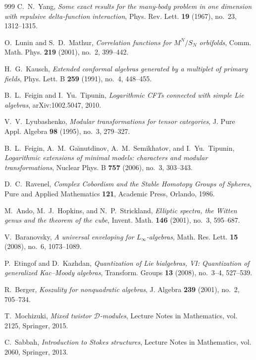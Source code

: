 \begin{thebibliography}{999}
C.~N.~Yang, \emph{Some exact results for the many-body problem in one dimension with repulsive delta-function interaction}, Phys. Rev. Lett. \textbf{19} (1967), no.~23, 1312--1315.

O.~Lunin and S.~D.~Mathur, \emph{Correlation functions for $M^N/S_N$ orbifolds}, Comm. Math. Phys. \textbf{219} (2001), no.~2, 399--442.

H.~G.~Kausch, \emph{Extended conformal algebras generated by a multiplet of primary fields}, Phys. Lett. B \textbf{259} (1991), no.~4, 448--455.

B.~L.~Feigin and I.~Yu.~Tipunin, \emph{Logarithmic CFTs connected with simple Lie algebras}, arXiv:1002.5047, 2010.

V.~V.~Lyubashenko, \emph{Modular transformations for tensor categories}, J. Pure Appl. Algebra \textbf{98} (1995), no.~3, 279--327.

B.~L.~Feigin, A.~M.~Ga\u{\i}nutdinov, A.~M.~Semikhatov, and I.~Yu.~Tipunin, \emph{Logarithmic extensions of minimal models: characters and modular transformations}, Nuclear Phys. B \textbf{757} (2006), no.~3, 303--343.

D.~C.~Ravenel, \emph{Complex Cobordism and the Stable Homotopy Groups of Spheres}, Pure and Applied Mathematics \textbf{121}, Academic Press, Orlando, 1986.

M.~Ando, M.~J.~Hopkins, and N.~P.~Strickland, \emph{Elliptic spectra, the Witten genus and the theorem of the cube}, Invent. Math. \textbf{146} (2001), no.~3, 595--687.

V.~Baranovsky, \emph{A universal enveloping for $L_\infty$-algebras}, Math. Res. Lett. \textbf{15} (2008), no.~6, 1073--1089.

P.~Etingof and D.~Kazhdan, \emph{Quantization of Lie bialgebras, VI: Quantization of generalized Kac--Moody algebras}, Transform. Groups \textbf{13} (2008), no.~3--4, 527--539.

R.~Berger, \emph{Koszulity for nonquadratic algebras}, J. Algebra \textbf{239} (2001), no.~2, 705--734.

T.~Mochizuki, \emph{Mixed twistor $\mathcal{D}$-modules}, Lecture Notes in Mathematics, vol. 2125, Springer, 2015.

C.~Sabbah, \emph{Introduction to Stokes structures}, Lecture Notes in Mathematics, vol. 2060, Springer, 2013.


\end{thebibliography}
